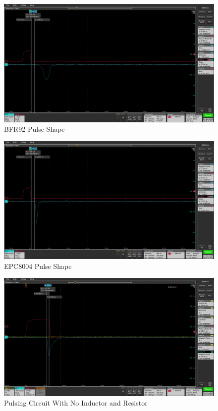 \documentclass[a4paper,11pt]{article}
\begin{document}
\begin{figure}[htbp]
\centering
\includegraphics[scale=0.3]{bfr92st310nh_000.png}
\caption{BFR92 Pulse Shape\label{fig:BFR92PulseShape}}
\end{figure}

\begin{figure}[htbp]
\centering
\includegraphics[scale=0.3]{800420nh47pf_000.png}
\caption{EPC8004 Pulse Shape\label{fig:EPC8004PulseShape}}
\end{figure}

\begin{figure}[htbp]
\centering
\includegraphics[scale=0.3]{RCTHTest1 no inductor.png}
\caption{Pulsing Circuit With No Inductor and Resistor\label{fig:NoRLPulse}}
\end{figure}
\end{document}

